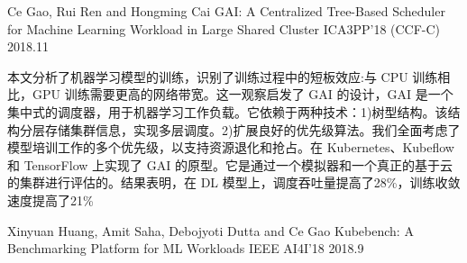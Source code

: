 
\begin{cventries}

  \cventry
    {Ce Gao, Rui Ren and Hongming Cai} %
    {GAI: A Centralized Tree-Based Scheduler for Machine Learning Workload in Large Shared Cluster} %
    {ICA3PP'18 (CCF-C)} %
    {2018.11} %
    {
      \begin{cvitems} %
        \item {
          本文分析了机器学习模型的训练，识别了训练过程中的短板效应:与 CPU 训练相比，GPU 训练需要更高的网络带宽。这一观察启发了 GAI 的设计，GAI 是一个集中式的调度器，用于机器学习工作负载。它依赖于两种技术：1)树型结构。该结构分层存储集群信息，实现多层调度。2)扩展良好的优先级算法。我们全面考虑了模型培训工作的多个优先级，以支持资源退化和抢占。在 Kubernetes、Kubeflow 和 TensorFlow 上实现了 GAI 的原型。它是通过一个模拟器和一个真正的基于云的集群进行评估的。结果表明，在 DL 模型上，调度吞吐量提高了28\%，训练收敛速度提高了21\%
        }
      \end{cvitems}
    }

  \cventry
    {Xinyuan Huang, Amit Saha, Debojyoti Dutta and Ce Gao} %
    {Kubebench: A Benchmarking Platform for ML Workloads} %
    {IEEE AI4I'18} %
    {2018.9} %
    {
    }

\end{cventries}
